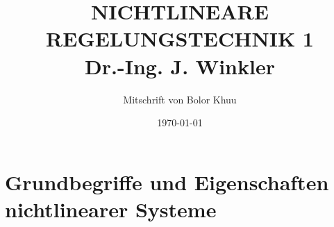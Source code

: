 \documentclass[ngerman]{tudscrreprt}
\begin{document}
 \department{}  \chair{} \title{NICHTLINEARE REGELUNGSTECHNIK 1\\ Dr.-Ing. J. Winkler
}
\author{Mitschrift von Bolor Khuu}
\date{\today}
\maketitle
\tableofcontents
\newpage
\chapter{Grundbegriffe und Eigenschaften nichtlinearer Systeme}
\end{document}
